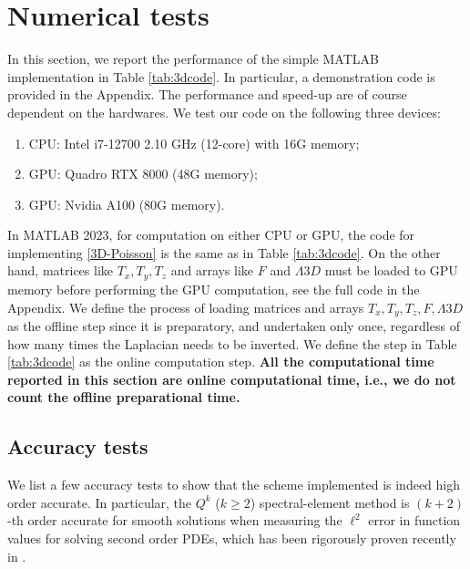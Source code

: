 \documentclass{article}
\begin{document}
  
\section{Numerical tests}
\label{sec:test}

In this section, we report the performance of the simple MATLAB implementation in Table \ref{tab:3dcode}. In particular, a demonstration code is provided in the Appendix. The performance and speed-up are of course dependent on the hardwares. We test our code on the following three devices:
\begin{enumerate}
    \item CPU: Intel  i7-12700  2.10 GHz (12-core) with 16G memory;
    \item GPU: Quadro RTX 8000 (48G memory); 
    \item GPU: Nvidia A100 (80G memory).
\end{enumerate}

    In MATLAB 2023, for computation on either CPU or GPU, the code for implementing \eqref{3D-Poisson} is the same as in Table \ref{tab:3dcode}. On the other hand, matrices like $T_x, T_y, T_z$ and arrays like $F$ and $\Lambda3D$ must be loaded to GPU memory before performing the GPU computation, see the full code in the Appendix. We define the process of loading matrices and arrays $T_x, T_y, T_z, F, \Lambda3D$ as the offline step since it is preparatory, and undertaken only once, regardless of how many times the Laplacian needs to be inverted. We define the step in Table \ref{tab:3dcode} as the online computation step. {\bf All the computational time reported in this section are online computational time, i.e., we do not count the offline preparational time.} 
     
\subsection{Accuracy tests}
\label{sec:poisson-accuracy}
We list a few accuracy tests to show that 
the scheme implemented is indeed high order accurate. 
In particular, the $Q^k$ ($k\geq 2$) spectral-element method is $(k+2)$-th order accurate for smooth solutions when measuring the $\ell^2$ error in function values for solving second order PDEs, which has been rigorously proven recently 
in \cite{li2020superconvergence, li2022accuracy}. 
\end{document}
